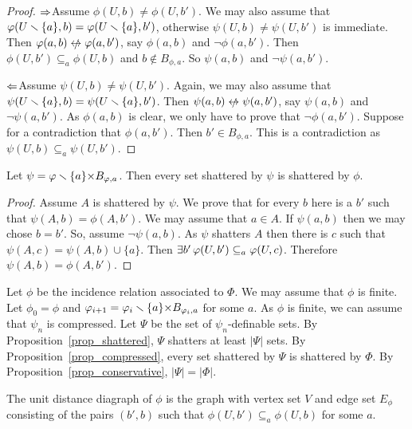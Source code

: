 \documentclass[sputnik.tex]{subfiles}
\begin{document}
\begin{proof}
$\Rightarrow$\quad Assume $\phi(U,b)\neq\phi(U,b')$.
We may also assume that $\varphi(U\smallsetminus\{a\},b)=\varphi(U\smallsetminus\{a\},b')$, otherwise $\psi(U,b)\neq\psi(U,b')$ is immediate.
Then $\phi(a,b)\niff\phi(a,b')$, say $ \phi(a,b)$ and $\neg \phi(a,b')$.
Then $\phi(U,b')\subseteq_a\phi(U,b)$ and $b\notin B_{\phi,a}$.
So $\psi(a,b)$ and $\neg \psi(a,b')$.

$\Leftarrow$\quad Assume $\psi(U,b)\neq\psi(U,b')$. 
Again, we may also assume that $\psi(U\smallsetminus\{a\},b)=\psi(U\smallsetminus\{a\},b')$.
Then $\psi(a,b)\niff\psi(a,b')$, say $\psi(a,b)$ and $\neg\psi(a,b')$.
As $\phi(a,b)$ is clear, we only have to prove that $\neg\phi(a,b')$.
Suppose for a contradiction that $\phi(a,b')$.
Then $b'\in B_{\phi,a}$.
This is a contradiction as $\psi(U,b)\subseteq_a\psi(U,b')$.
\end{proof}


\begin{proposition}\label{prop_shattered} 
Let $\psi=\varphi\smallsetminus\{a\}{\times}B_{\varphi,a}$.
Then every set shattered by $\psi$ is shattered by $\phi$.
\end{proposition}

\begin{proof}
Assume $A$ is shattered by $\psi$.
We prove that for every $b$ here is a $b'$ such that $\psi(A,b)=\phi(A,b')$.
We may assume that $a\in A$.
If $\psi(a,b)$ then we may chose $b=b'$.
So, assume $\neg\psi(a,b)$.
As $\psi$ shatters $A$ then there is $c$ such that $\psi(A,c)=\psi(A,b)\cup\{a\}$.
Then $\exists b'\,\varphi(U,b')\subseteq_a\varphi(U,c)$.
Therefore $\psi(A,b)=\phi(A,b')$.
\end{proof}


\begin{void_thm}\label{proof2_Pajor}\rm
Let $\phi$ be the incidence relation associated to $\Phi$. We may assume that $\phi$ is finite. Let $\phi_0=\phi$ and $\varphi_{i+1}=\varphi_i\smallsetminus \{a\}{\times}B_{\varphi_i,a}$ for some $a$. As $\phi$ is finite, we can assume that $\psi_n$ is compressed. Let $\Psi$ be the set of $\psi_n$-definable sets. By Proposition~\ref{prop_shattered}, $\Psi$ shatters at least $|\Psi|$ sets. By Proposition~\ref{prop_compressed}, every set shattered by $\Psi$ is shattered by $\Phi$. By Proposition~\ref{prop_conservative}, $|\Psi|=|\Phi|$.\QED
\end{void_thm}


The unit distance diagraph of $\phi$ is the graph with vertex set $V$ and edge set $E_\phi$ consisting of the pairs $(b',b)$ such that $\phi(U,b')\subseteq_a\phi(U,b)$ for some $a$.
\end{document}
